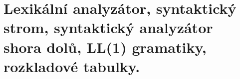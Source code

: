 \section[PAL - Analyzátory, gramatiky]{Lexikální analyzátor, syntaktický strom, syntaktický analyzátor shora dolů, LL(1) gramatiky, rozkladové tabulky.}
